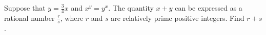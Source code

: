 Suppose that $ y = \frac34x$ and $ x^y = y^x$. The quantity $ x + y$ can be expressed as a rational number $ \frac{r}{s}$, where $ r$ and $ s$ are relatively prime positive integers. Find $ r + s$.